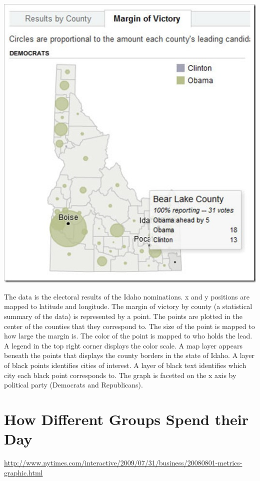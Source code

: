 \documentclass{article}
\begin{document}
  \includegraphics[width=1.0\textwidth]{plots/primary.jpg} %


The data is the electoral results of the Idaho nominations. x and y positions are mapped to latitude and longitude. The margin of victory by county (a statistical summary of the data) is represented by a point. The points are plotted in the center of the counties that they correspond to. The size of the point is mapped to how large the margin is. The color of the point is mapped to who holds the lead. A legend in the top right corner displays the color scale. A map layer appears beneath the points that displays the county borders in the state of Idaho.  A layer of black points identifies cities of interest. A layer of black text identifies which city each black point corresponds to. The graph is facetted on the x axis by political party (Democrats and Republicans).

\section{How Different Groups Spend their Day}
\href{http://www.nytimes.com/interactive/2009/07/31/business/20080801-metrics-graphic.html}{http://www.nytimes.com/interactive/2009/07/31/business/20080801-metrics-graphic.html}\\
\end{document}
